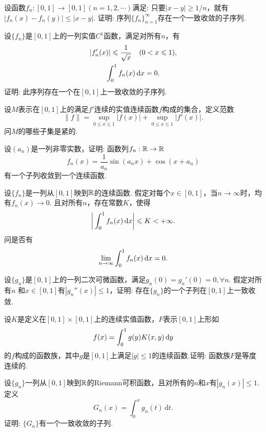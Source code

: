 \begin{example}
  设函数$f_n:[0,1]\to[0,1](n=1,2,\cdots)$满足: 只要$|x-y|\ge1/n$，就有$|f_n(x)-f_n(y)|\le|x-y|$. 证明: 序列$\{f_n\}_{n=1}^\infty$存在一个一致收敛的子序列.
\end{example}

\begin{example}
  设$\{f_n\}$是$[0,1]$上的一列实值$C^1$函数，满足对所有$n$，有
  \begin{gather*}
    |f_n'(x)| \leqslant \frac1{\sqrt x}\quad(0<x\leqslant 1),\\
    \int_0^1f_n(x)\,\mathrm dx = 0.
  \end{gather*}
  证明: 此序列存在一个在$[0,1]$上一致收敛的子序列.
\end{example}

\begin{example}
  设$M$表示在$[0,1]$上的满足$f'$连续的实值连续函数$f$构成的集合，定义范数
  \[ \|f\| = \sup_{0\le x\le1}|f(x)| + \sup_{0\le x\le1}|f'(x)|. \]
  问$M$的哪些子集是紧的.
\end{example}

\begin{example}
  设$(a_n)$是一列非零实数，证明: 函数列$f_n:\mathbb R\to\mathbb R$
  \[ f_n(x) = \frac1{a_n}\sin(a_n x)+ \cos (x+a_n) \]
  有一个子列收敛到一个连续函数.
\end{example}

\begin{example}
  设$\{f_n\}$是一列从$[0,1]$映到$\mathbb R$的连续函数. 假定对每个$x\in[0,1]$，当$n\to\infty$时，均有$f_n(x)\to0$. 且对所有$n$，存在常数$K$，使得
  \[ \bigg| \int_0^1f_n(x)\,\mathrm dx \bigg| \leqslant K <+\infty. \]
  问是否有
  \[ \lim_{n\to\infty}\int_0^1f_n(x)\,\dx = 0. \]
\end{example}

\begin{example}
  设$\{g_n\}$是$[0,1]$上的一列二次可微函数，满足$g_n(0)=g_n'(0)=0,\forall n$. 假定对所有$n$ 和$x\in[0,1]$有$|g_n''(x)|\le 1$，证明: 存在$\{g_n\}$的一个子列在$[0,1]$上一致收敛.
\end{example}

\begin{example}
  设$K$是定义在$[0,1]\times[0,1]$上的连续实值函数，$F$表示$[0,1]$上形如
  \[ f(x) = \int_0^1g(y)K(x,y)\,\mathrm dy \]
  的$f$构成的函数族，其中$g$是$[0,1]$上满足$|g|\le1$的连续函数.证明: 函数族$F$是等度连续的.
\end{example}

\begin{example}
  设$\{g_n\}$一列从$[0,1]$映到$\mathbb R$的Riemann可积函数，且对所有的$n$和$x$有$|g_n(x)|\le1$. 定义
  \[ G_n(x) = \int_0^xg_n(t)\,\mathrm dt. \]
  证明: $\{G_n\}$有一个一致收敛的子列.
\end{example}

